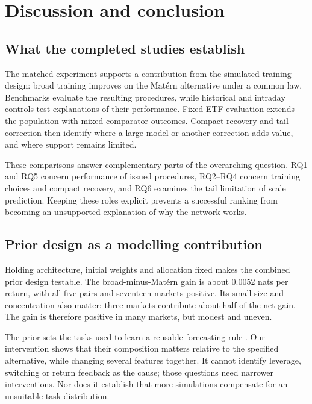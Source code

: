 \chapter{Discussion and conclusion}
\label{ch:discussion}

\section{What the completed studies establish}

The matched experiment supports a contribution from the simulated training design: broad training improves on the Mat\'ern alternative under a common law. Benchmarks evaluate the resulting procedures, while historical and intraday controls test explanations of their performance. Fixed ETF evaluation extends the population with mixed comparator outcomes. Compact recovery and tail correction then identify where a large model or another correction adds value, and where support remains limited.

These comparisons answer complementary parts of the overarching question. RQ1 and RQ5 concern performance of issued procedures, RQ2--RQ4 concern training choices and compact recovery, and RQ6 examines the tail limitation of scale prediction. Keeping these roles explicit prevents a successful ranking from becoming an unsupported explanation of why the network works.

\section{Prior design as a modelling contribution}

Holding architecture, initial weights and allocation fixed makes the combined prior design testable. The broad-minus-Mat\'ern gain is about 0.0052 nats per return, with all five pairs and seventeen markets positive. Its small size and concentration also matter: three markets contribute about half of the net gain. The gain is therefore positive in many markets, but modest and uneven.

The prior sets the tasks used to learn a reusable forecasting rule \citep{muller2022transformers}. Our intervention shows that their composition matters relative to the specified alternative, while changing several features together. It cannot identify leverage, switching or return feedback as the cause; those questions need narrower interventions. Nor does it establish that more simulations compensate for an unsuitable task distribution.

